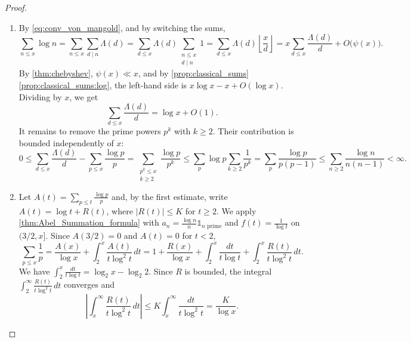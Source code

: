 \begin{proof}\leavevmode
    \begin{enumerate}[label={\upshape\roman*)}]
        \item By \cref{eq:conv_von_mangold}, and by switching the sums,
            \begin{equation*}
                \sum_{n\le x}\log n = \sum_{n\le x}\sum_{d\mid n}\Lambda(d) = \sum_{d\le x}\Lambda(d)\sum_{\substack{n\le x\\ d\mid n}}1 = \sum_{d\le x}\Lambda(d)\left\lfloor\frac xd\right\rfloor = x\sum_{d\le x}\frac{\Lambda(d)}{d} + O\big(\psi(x)\big).
            \end{equation*}
            By \cref{thm:chebyshev}, $\psi(x) \ll x$, and by \cref{prop:classical_sums} \ref{prop:classical_sums:log}, the left-hand side is $x\log x - x + O(\log x)$. Dividing by $x$, we get
            \begin{equation*}
                \sum_{d\le x}\frac{\Lambda(d)}{d} = \log x + O(1).
            \end{equation*}
            It remains to remove the prime powers $p^k$ with $k \ge 2$. Their contribution is bounded independently of $x$:
            \begin{equation*}
                0\le \sum_{d\le x}\frac{\Lambda(d)}{d} - \sum_{p\le x}\frac{\log p}{p} = \sum_{\substack{p^k\le x\\k\ge2}}\frac{\log p}{p^k}\le\sum_p\log p\sum_{k\ge2}\frac1{p^k} = \sum_p\frac{\log p}{p(p-1)}\le\sum_{n\ge2}\frac{\log n}{n(n-1)}<\infty.
            \end{equation*}
        \item Let $A(t) = \sum_{p\le t}\frac{\log p}{p}$ and, by the first estimate, write $A(t) = \log t + R(t)$, where $\lvert R(t)\rvert\le K$ for $t\ge2$. We apply \cref{thm:Abel_Summation_formula} with $a_n = \frac{\log n}{n}\mathds{1}_{n \text{ prime}}$ and $f(t) = \frac 1{\log t}$ on $(3/2,x]$. Since $A(3/2) = 0$ and $A(t)=0$ for $t<2$,
        \begin{equation*}
            \sum_{p\le x}\frac{1}{p} = \frac{A(x)}{\log x} + \int_{2}^{x}\frac{A(t)}{t\log^2 t}\,dt = 1 + \frac{R(x)}{\log x} + \int_2^x\frac{dt}{t\log t} + \int_2^x\frac{R(t)}{t\log^2t}\,dt.
        \end{equation*}
        We have $\int_2^x\frac{dt}{t\log t} = \log_2 x - \log_2 2$. Since $R$ is bounded, the integral $\int_2^\infty \frac{R(t)}{t\log^2t}\,dt$ converges and
        \begin{equation*}
            \left\lvert\int_x^\infty\frac{R(t)}{t\log^2 t}\,dt\right\rvert\le K\int_x^\infty\frac{dt}{t\log^2t} = \frac{K}{\log x}.

\end{equation*}
\end{enumerate}
\end{proof}
